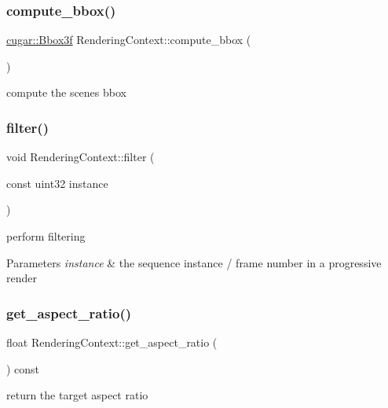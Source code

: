 \subsubsection{\texorpdfstring{compute\+\_\+bbox()}{compute\_bbox()}}
{\footnotesize\ttfamily \hyperlink{structcugar_1_1_bbox}{cugar\+::\+Bbox3f} Rendering\+Context\+::compute\+\_\+bbox (\begin{DoxyParamCaption}{ }\end{DoxyParamCaption})}

compute the scene\textquotesingle{}s bbox \mbox{\label{struct_rendering_context_a7dc602302bd972f8e72e57ca2ca01e44}} 
\subsubsection{\texorpdfstring{filter()}{filter()}}
{\footnotesize\ttfamily void Rendering\+Context\+::filter (\begin{DoxyParamCaption}\item[{const uint32}]{instance }\end{DoxyParamCaption})}

perform filtering


\begin{DoxyParams}{Parameters}
{\em instance} & the sequence instance / frame number in a progressive render \\
\hline
\end{DoxyParams}
\mbox{\label{struct_rendering_context_a850133038f31781d0666dad09cd56553}} 
\subsubsection{\texorpdfstring{get\+\_\+aspect\+\_\+ratio()}{get\_aspect\_ratio()}}
{\footnotesize\ttfamily float Rendering\+Context\+::get\+\_\+aspect\+\_\+ratio (\begin{DoxyParamCaption}{ }\end{DoxyParamCaption}) const}

return the target aspect ratio \mbox{\label{struct_rendering_context_aa23f799fc75e822740e23cbe4ffabc64}} 
